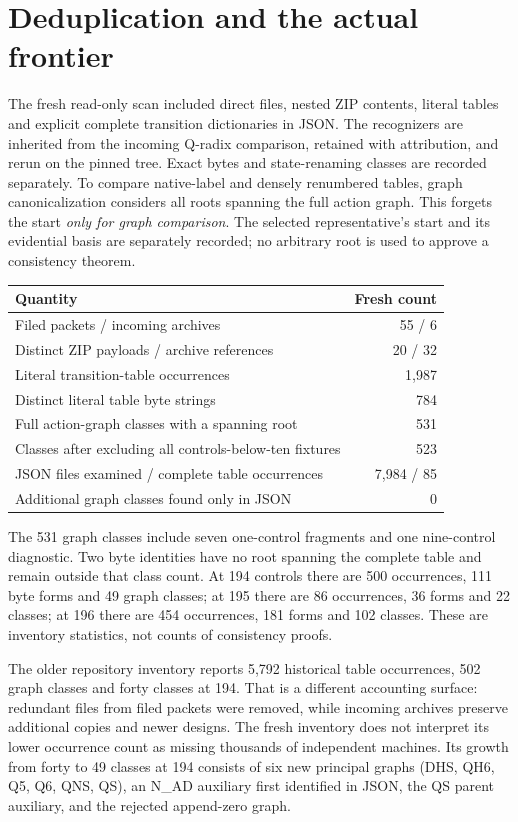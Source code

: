 \documentclass[10pt]{article}
\begin{document}
\section{Deduplication and the actual frontier}

The fresh read-only scan included direct files, nested ZIP contents, literal
tables and explicit complete transition dictionaries in JSON. The recognizers
are inherited from the incoming Q-radix comparison, retained with attribution,
and rerun on the pinned tree. Exact bytes and state-renaming classes are recorded
separately. To compare native-label and densely renumbered tables, graph
canonicalization considers all roots spanning the full action graph. This
forgets the start \emph{only for graph comparison}. The selected representative's
start and its evidential basis are separately recorded; no arbitrary root is
used to approve a consistency theorem.

\begin{center}
\begin{tabular}{lr}
\toprule
Quantity & Fresh count\\
\midrule
Filed packets / incoming archives &55 / 6\\
Distinct ZIP payloads / archive references &20 / 32\\
Literal transition-table occurrences &1,987\\
Distinct literal table byte strings &784\\
Full action-graph classes with a spanning root &531\\
Classes after excluding all controls-below-ten fixtures &523\\
JSON files examined / complete table occurrences &7,984 / 85\\
Additional graph classes found only in JSON &0\\
\bottomrule
\end{tabular}
\end{center}

The 531 graph classes include seven one-control fragments and one nine-control
diagnostic. Two byte identities have no root spanning the complete table and
remain outside that class count. At 194 controls there are 500 occurrences,
111 byte forms and 49 graph classes; at 195 there are 86 occurrences, 36 forms
and 22 classes; at 196 there are 454 occurrences, 181 forms and 102 classes.
These are inventory statistics, not counts of consistency proofs.

The older repository inventory reports 5,792 historical table occurrences,
502 graph classes and forty classes at 194. That is a different accounting
surface: redundant files from filed packets were removed, while incoming
archives preserve additional copies and newer designs. The fresh inventory
does not interpret its lower occurrence count as missing thousands of
independent machines. Its growth from forty to 49 classes at 194 consists of
six new principal graphs (DHS, QH6, Q5, Q6, QNS, QS), an N\_AD auxiliary first
identified in JSON, the QS parent auxiliary, and the rejected append-zero graph.
\end{document}
